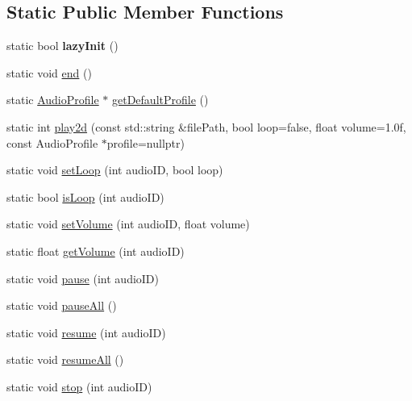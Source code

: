 \subsection*{Static Public Member Functions}
\begin{DoxyCompactItemize}
\item 
\mbox{\label{classexperimental_1_1AudioEngine_a52024f30bece9adf911e6cf140d47bfe}} 
static bool {\bfseries lazy\+Init} ()
\item 
static void \hyperlink{classexperimental_1_1AudioEngine_a17ea6cda24d6c4d951d5b60b6d2afca0}{end} ()
\item 
static \hyperlink{classexperimental_1_1AudioProfile}{Audio\+Profile} $\ast$ \hyperlink{classexperimental_1_1AudioEngine_a0579fbcef062480d4de9edf98857cf12}{get\+Default\+Profile} ()
\item 
static int \hyperlink{classexperimental_1_1AudioEngine_ae7693b0ea2b5f2334153ebdf7ccb93d2}{play2d} (const std\+::string \&file\+Path, bool loop=false, float volume=1.\+0f, const Audio\+Profile $\ast$profile=nullptr)
\item 
static void \hyperlink{classexperimental_1_1AudioEngine_a4d9aa8312f064b9bcdc06888c4306c23}{set\+Loop} (int audio\+ID, bool loop)
\item 
static bool \hyperlink{classexperimental_1_1AudioEngine_a7a636855b8bd54af196a9f6947791d3b}{is\+Loop} (int audio\+ID)
\item 
static void \hyperlink{classexperimental_1_1AudioEngine_a6759e7f6b0e2da64523949cf361a083e}{set\+Volume} (int audio\+ID, float volume)
\item 
static float \hyperlink{classexperimental_1_1AudioEngine_ab6545ae46e79147482bb50861c91e5e9}{get\+Volume} (int audio\+ID)
\item 
static void \hyperlink{classexperimental_1_1AudioEngine_a1989c81a914d8f927c4f2decfacd3a96}{pause} (int audio\+ID)
\item 
static void \hyperlink{classexperimental_1_1AudioEngine_a3d08304458bf45967020a9ab00e91eb3}{pause\+All} ()
\item 
static void \hyperlink{classexperimental_1_1AudioEngine_aa45189f10c2113f68728ee2157e8eb55}{resume} (int audio\+ID)
\item 
static void \hyperlink{classexperimental_1_1AudioEngine_a8618e28e77cfeebe8cf6b2798ae90ae9}{resume\+All} ()
\item 
static void \hyperlink{classexperimental_1_1AudioEngine_a932422ecf6818ac5e81e4530e556fd1e}{stop} (int audio\+ID)

\end{DoxyCompactItemize}
